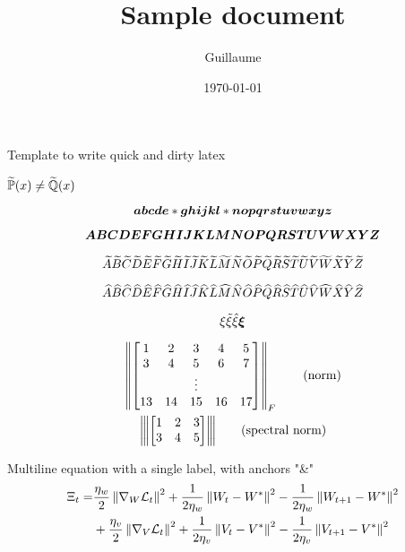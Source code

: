 \documentclass{article}
\title{Sample document}
\author{Guillaume}
\date{\today}
\begin{document}
\maketitle

Template to write quick and dirty latex


\TODO{}

$\tPP(x) \neq \tQQ(x)$

\begin{equation}
\ba \bb \bc \bd \be * \bg \bh \bi \bj \bk \bl * \bn \bo \bp \bq \br \bs \bt \bu \bv \bw \bx \by \bz
\end{equation}

\begin{equation}
\bA \bB \bC \bD \bE \bF \bG \bH \bI \bJ \bK \bL \bM \bN \bO \bP \bQ \bR \bS \bT \bU \bV \bW \bX \bY \bZ
\end{equation}

\begin{equation}
\tA \tB \tC \tD \tE \tF \tG \tH \tI \tJ \tK \tL \tM \tN \tO \tP \tQ \tR \tS \tT \tU \tV \tW \tX \tY \tZ
\end{equation}

\begin{equation}
\hA \hB \hC \hD \hE \hF \hG \hH \hI \hJ \hK \hL \hM \hN \hO \hP \hQ \hR \hS \hT \hU \hV \hW \hX \hY \hZ
\end{equation}

\begin{equation}
\xi \txi \hxi \bxi
\end{equation}

\begin{gather}
    \norm{
    \begin{bmatrix}
        1 & 2 & 3 & 4 & 5 \\
        3 & 4 & 5 & 6 & 7 \\
        && \vdots && \\
        13 & 14 & 15 & 16 & 17 \\
    \end{bmatrix}
    }_F \label{eq:norm} \tag{norm} \\
    \spnorm{
    \begin{bmatrix}
        1 & 2 & 3 \\
        3 & 4 & 5
    \end{bmatrix}
    } \label{eq:spnorm} \tag{spectral norm}
\end{gather}

Multiline equation with a single label, with anchors "\&"
\begin{equation}
\begin{split}
    \Xi_t =& \frac{\eta_w}{2}\norm{\nabla_{W} \LLL_t}^2 + \frac{1}{2\eta_w}\norm{W_t - W^*}^2 - \frac{1}{2\eta_w}\norm{W_{t+1} - W^*}^2 \\ 
    &+ \frac{\eta_v}{2}\norm{\nabla_{V} \LLL_t}^2 + \frac{1}{2\eta_v}\norm{V_t - V^*}^2 - \frac{1}{2\eta_v}\norm{V_{t+1} - V^*}^2 
\end{split}
\end{equation}
\end{document}
